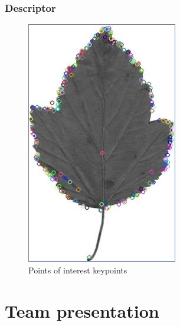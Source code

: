 \documentclass[xcolor=table]{beamer}
\begin{document}
\begin{frame} \frametitle{Descriptor}
    \begin{figure}[h]
        \centering
        \includegraphics[scale=0.35]{siftKP.jpg}
        \caption{Points of interest keypoints}
        \label{fig:img_poi}
    \end{figure}

\end{frame}


\section{Team presentation}
\end{document}
